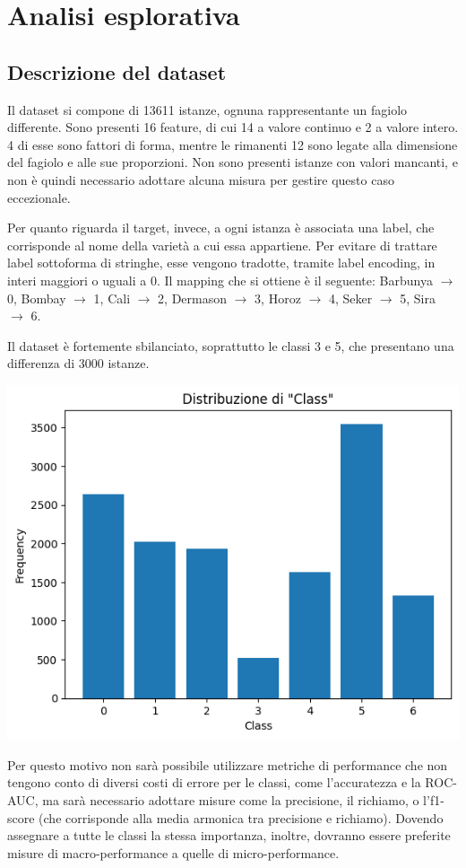 \section{Analisi esplorativa}
\subsection{Descrizione del dataset}
Il dataset si compone di 13611 istanze, ognuna rappresentante un fagiolo
differente.
Sono presenti 16 feature, di cui 14 a valore continuo e 2 a valore intero.
4 di esse sono fattori di forma, mentre
le rimanenti 12 sono legate alla dimensione del fagiolo e alle
sue proporzioni.
Non sono presenti istanze con valori mancanti, e non è quindi necessario
adottare alcuna misura per gestire questo caso eccezionale.

Per quanto riguarda il target, invece, a ogni istanza è associata una label,
che corrisponde al nome della varietà a cui
essa appartiene. Per evitare di trattare label sottoforma di stringhe,
esse vengono tradotte, tramite label encoding, in interi maggiori o uguali a 0.
Il mapping che si ottiene è il seguente: Barbunya $\rightarrow$ 0, 
Bombay $\rightarrow$ 1, Cali $\rightarrow$ 2, Dermason $\rightarrow$ 3,
Horoz $\rightarrow$ 4, Seker $\rightarrow$ 5, Sira $\rightarrow$ 6.

Il dataset è fortemente sbilanciato, soprattutto le classi 3 e 5, che
presentano una differenza di 3000 istanze. 
\begin{Figure}
    \centering
    \includegraphics[width=\linewidth]{img/unbalanced_dataset.png}
\end{Figure}
Per questo motivo non sarà possibile
utilizzare metriche di performance che non tengono conto di diversi costi
di errore per le classi, come l'accuratezza e la ROC-AUC, ma sarà necessario adottare misure
come la precisione, il richiamo, o l'f1-score (che corrisponde alla media
armonica tra precisione e richiamo).
Dovendo assegnare a tutte le classi la stessa importanza, inoltre, dovranno essere
preferite misure di macro-performance a quelle di micro-performance.

